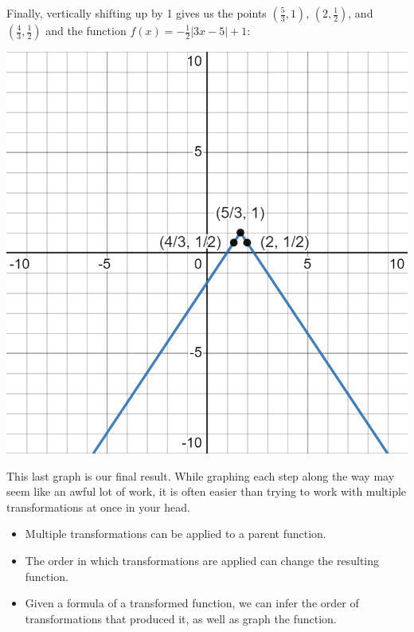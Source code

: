 \documentclass[handout, noauthor, nooutcomes]{ximera}
\begin{document}
\begin{example}
\begin{explanation}
Finally, vertically shifting up by 1 gives us the points $\left(\frac{5}{3}, 1\right)$, $\left(2, \frac{1}{2}\right)$, and $\left(\frac{4}{3}, \frac{1}{2}\right)$ and the function $f(x) = -\frac{1}{2}|3x - 5| + 1$:

\includegraphics[width=1\linewidth]{images/exgraph6.png}

This last graph is our final result. While graphing each step along the way may seem like an awful lot of work, it is often easier than trying to work with multiple transformations at once in your head. 
\end{explanation}
\end{example}






\begin{summary}\begin{itemize}
\item Multiple transformations can be applied to a parent function.
\item The order in which transformations are applied can change the resulting function.
\item Given a formula of a transformed function, we can infer the order of transformations that produced it, as well as graph the function. 
\end{itemize}\end{summary}
\end{document}
